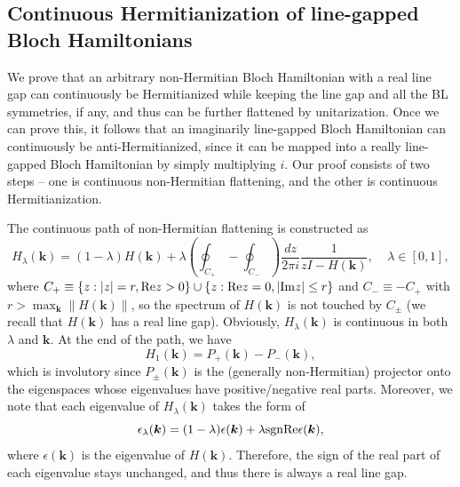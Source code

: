 \documentclass{tADP2e}
\theoremstyle{plain}
\theoremstyle{plain}
\theoremstyle{definition}
\begin{document}
\begin{appendices}
\section{Continuous Hermitianization of line-gapped Bloch Hamiltonians}\label{app4}
We prove that an arbitrary non-Hermitian Bloch Hamiltonian with a real line gap can continuously be Hermitianized while keeping the line gap and all the BL symmetries, if any, and thus can be further flattened by unitarization. Once we can prove this, it follows that an imaginarily line-gapped Bloch Hamiltonian can continuously be anti-Hermitianized, since it can be mapped into a really line-gapped Bloch Hamiltonian by simply multiplying $i$. Our proof consists of two steps -- one is continuous non-Hermitian flattening, and the other is continuous Hermitianization.

The continuous path of non-Hermitian flattening is constructed as
\begin{equation}
H_{\lambda}(\boldsymbol{k})=(1-\lambda)H(\boldsymbol{k})+\lambda\left(\oint_{C_+}-\oint_{C_-}\right)\frac{dz}{2\pi i}\frac{1}{zI-H(\boldsymbol{k})},\;\;\;\;\lambda\in[0,1],
\label{NHflat}
\end{equation}
where $C_+\equiv\{z:|z|=r,{\rm Re}z>0\}\cup\{z:{\rm Re}z=0,|{\rm Im}z|\le r\}$ and $C_-\equiv-C_+$ with $r>\max_{\boldsymbol{k}}\|H(\boldsymbol{k})\|$, so the spectrum of $H(\boldsymbol{k})$ is not touched by $C_\pm$ (we recall that $H(\boldsymbol{k})$ has a real line gap). Obviously, $H_{\lambda}(\boldsymbol{k})$ is continuous in both $\lambda$ and $\boldsymbol{k}$. At the end of the path, we have
\begin{equation}
H_1(\boldsymbol{k})=P_+(\boldsymbol{k})-P_-(\boldsymbol{k}),
\label{H1Ppm}
\end{equation}
which is involutory since $P_\pm(\boldsymbol{k})$ is the (generally non-Hermitian) projector onto the eigenspaces whose eigenvalues have positive/negative real parts. Moreover, we note that each eigenvalue of $H_{\lambda}(\boldsymbol{k})$ takes the form of
\begin{equation}
\epsilon_\lambda(\boldsymbol{k})=(1-\lambda)\epsilon(\boldsymbol{k})+\lambda{\rm sgn}{\rm Re}\epsilon(\boldsymbol{k}),
\end{equation}
where $\epsilon(\boldsymbol{k})$ is the eigenvalue of $H(\boldsymbol{k})$. Therefore, the sign of the real part of each eigenvalue stays unchanged, and thus there is always a real line gap.



\end{appendices}
\end{document}
